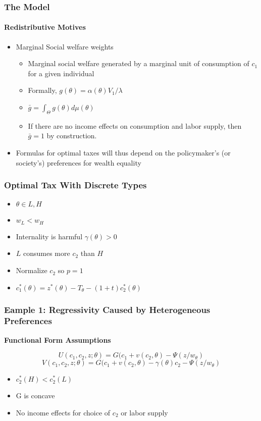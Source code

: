 \documentclass{beamer}
\begin{document}
\begin{frame}
\frametitle{The Model}
\framesubtitle{Redistributive Motives}
\begin{itemize}
	\item Marginal Social welfare weights 
	\begin{itemize}
		\item Marginal social welfare generated by a marginal unit of consumption of $c_1$ for a given individual 
		\item Formally, $g(\theta) = \alpha(\theta)V_1/\lambda$
		\item $\bar{g} = \int_{\Theta}^{}g(\theta)d\mu(\theta)$
		\item If there are no income effects on consumption and labor
		supply, then $\bar{g} =1$ by construction.
	\end{itemize}
\item Formulas for optimal taxes will thus depend on the policymaker’s (or society’s) preferences for wealth equality
	
\end{itemize}

\end{frame}






\begin{frame}
\frametitle{Optimal Tax With Discrete Types}

\begin{itemize}
	\item $\theta \in {L,H}$
	\item $w_L < w_H$
	\item Internality  is harmful $\gamma(\theta) > 0$
	\item $L$ consumes more $c_2$ than $H$
	\item Normalize $c_2$ so $p=1$
	\item $c_1^*(\theta) = z^*(\theta) - T_{\theta} - (1+t)c_2^*(\theta)$
	
\end{itemize}

\end{frame}






\begin{frame}
\frametitle{Eample 1: Regressivity Caused by Heterogeneous Preferences   }

\textbf{Functional Form Assumptions}

$$ U(c_1, c_2,z;\theta) = G(c_1 + v(c_2, \theta) - \Psi(z/w_{\theta}) $$
$$ V(c_1, c_2,z;\theta) = G(c_1 + v(c_2, \theta) - \gamma(\theta)c_2 - \Psi(z/w_{\theta})
$$
\begin{itemize}
	\item $c_2^*(H) < c_2^*(L)$
	\item G is concave
	\item No income effects for choice of $c_2$ or labor supply 
\end{itemize}
\end{frame}
	
\end{document}
